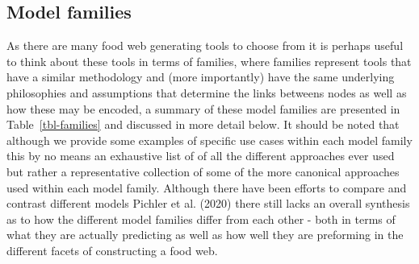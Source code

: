 \documentclass[
]{article}
\begin{document}
\subsection{Model families}\label{model-families}

As there are many food web generating tools to choose from it is perhaps
useful to think about these tools in terms of families, where families
represent tools that have a similar methodology and (more importantly)
have the same underlying philosophies and assumptions that determine the
links betweens nodes as well as how these may be encoded, a summary of
these model families are presented in Table~\ref{tbl-families} and
discussed in more detail below. It should be noted that although we
provide some examples of specific use cases within each model family
this by no means an exhaustive list of of all the different approaches
ever used but rather a representative collection of some of the more
canonical approaches used within each model family. Although there have
been efforts to compare and contrast different models Pichler et al.
(2020) there still lacks an overall synthesis as to how the different
model families differ from each other - both in terms of what they are
actually predicting as well as how well they are preforming in the
different facets of constructing a food web.
\end{document}
